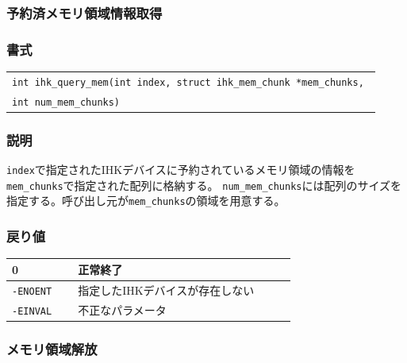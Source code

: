 \documentclass[twoside,11pt,fleqn]{book}
\begin{document}
\subsubsection{予約済メモリ領域情報取得}
\subsubsection*{書式}\begin{tabular}[t]{@{}l@{}}{\quad} \texttt{int ihk\_query\_mem(int index, struct ihk\_mem\_chunk *mem\_chunks, }\\{\quad}{\quad}\texttt{int num\_mem\_chunks)}\end{tabular}
\subsubsection*{説明}{\quad} \texttt{index}で指定されたIHKデバイスに予約されているメモリ領域の情報を\texttt{mem\_chunks}で指定された配列に格納する。 \texttt{num\_mem\_chunks}には配列のサイズを指定する。呼び出し元が\texttt{mem\_chunks}の領域を用意する。


\subsubsection*{戻り値}{\quad}
\begin{table}[!h]
\footnotesize
\begin{tabular}{|p{0.20\linewidth}|p{0.66\linewidth}|} \hline
0&正常終了\\ \hline
\texttt{-ENOENT}&指定したIHKデバイスが存在しない\\ \hline
\texttt{-EINVAL}&不正なパラメータ\\ \hline
\end{tabular}
\vspace{-0em}
\end{table}
\FloatBarrier

\subsubsection{メモリ領域解放}
\end{document}
